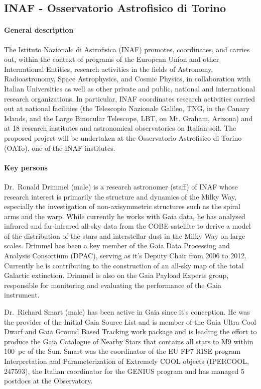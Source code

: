 \subsection{INAF - Osservatorio Astrofisico di Torino}
\label{sec:inaf}

\paragraph{General description}

The Istituto Nazionale di Astrofisica (INAF) promotes, coordinates, and carries out, within the context of programs of the European Union and other International Entities, research activities in the fields of Astronomy, Radioastronomy, Space Astrophysics, and Cosmic Physics, in collaboration with Italian Universities as well as other private and public, national and international research organizations. In particular, INAF coordinates research activities carried out at national facilities (the Telescopio Nazionale Galileo, TNG, in the Canary Islands, and the Large Binocular Telescope, LBT, on Mt. Graham, Arizona) and at 18 research institutes and astronomical observatories on Italian soil. The proposed project will be undertaken at the Osservatorio Astrofisico di Torino (OATo), one of the INAF institutes. 

\paragraph{Key persons}

Dr.~Ronald Drimmel (male) is a research astronomer (staff) of INAF whose research interest is primarily the structure and dynamics of the Milky Way, especially the investigation of non-axisymmetric structures such as the spiral arms and the warp. While currently he works with Gaia data, he has analysed infrared and far-infrared all-sky data from the COBE satellite to derive a model of the distribution of the stars and interstellar dust in the Milky Way on large scales. Drimmel has been a key member of the Gaia Data Processing and Analysis Consortium (DPAC), serving as it's Deputy Chair from 2006 to 2012. Currently he is contributing to the construction of an all-sky map of the total Galactic extinction. Drimmel is also on the Gaia Payload Experts group, responsible for monitoring and evaluating the performance of the Gaia instrument.

Dr.~Richard Smart (male) has been active in Gaia since it's conception. He was the provider of the Initial Gaia Source List \cite{2014A&A...570A..87S} and is member of the Gaia Ultra Cool Dwarf and Gaia Ground Based Tracking work package and is leading the effort to produce the Gaia Catalogue of Nearby Stars that contains all stars to M9 within 100~pc of the Sun. Smart was the coordinator of the EU FP7 RISE program Interpretation and Parameterization of Extremely COOL objects (IPERCOOL, 247593), the Italian coordinator for the GENIUS  program and has managed 5 postdocs at the Observatory. 

